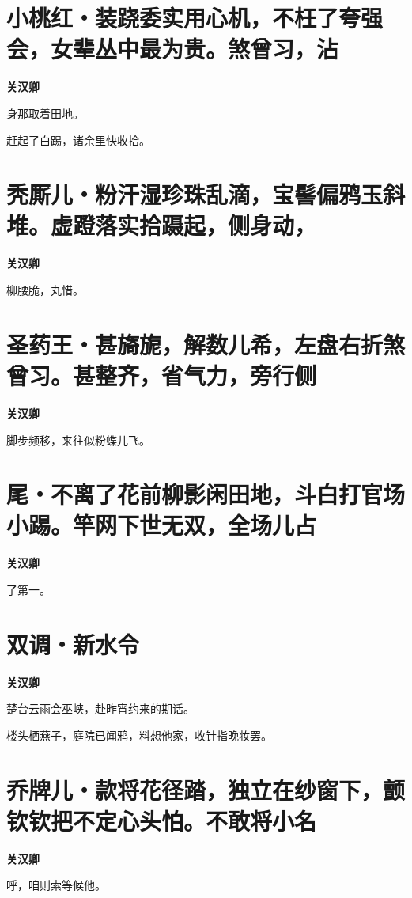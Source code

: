 \documentclass[12pt,a4paper]{ctexbook}
\begin{document}
\section{小桃红・装跷委实用心机，不枉了夸强会，女辈丛中最为贵。煞曾习，沾}
\textbf{关汉卿}\par\vspace{0.5em}
身那取着田地。\par
赶起了白踢，诸余里快收拾。\par

\section{秃厮儿・粉汗湿珍珠乱滴，宝髻偏鸦玉斜堆。虚蹬落实拾蹑起，侧身动，}
\textbf{关汉卿}\par\vspace{0.5em}
柳腰脆，丸惜。\par

\section{圣药王・甚旖旎，解数儿希，左盘右折煞曾习。甚整齐，省气力，旁行侧}
\textbf{关汉卿}\par\vspace{0.5em}
脚步频移，来往似粉蝶儿飞。\par

\section{尾・不离了花前柳影闲田地，斗白打官场小踢。竿网下世无双，全场儿占}
\textbf{关汉卿}\par\vspace{0.5em}
了第一。\par

\section{双调・新水令}
\textbf{关汉卿}\par\vspace{0.5em}
楚台云雨会巫峡，赴昨宵约来的期话。\par
楼头栖燕子，庭院已闻鸦，料想他家，收针指晚妆罢。\par

\section{乔牌儿・款将花径踏，独立在纱窗下，颤钦钦把不定心头怕。不敢将小名}
\textbf{关汉卿}\par\vspace{0.5em}
呼，咱则索等候他。\par
\end{document}
